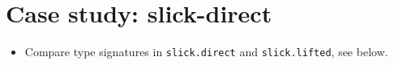 \section{Case study: slick-direct} %
\label{sec:CaseStudy}
\begin{itemize}
    \item Compare type signatures in \texttt{slick.direct} and \texttt{slick.lifted}, see below.
\end{itemize}




